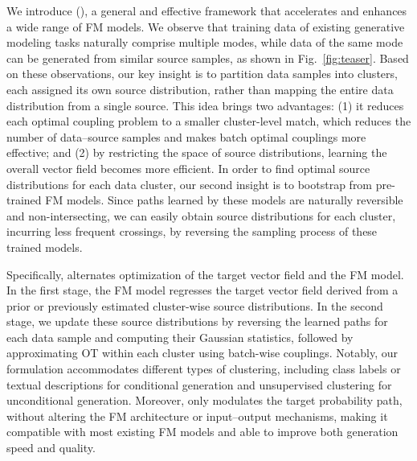 We introduce \methodfull{} (\method{}), a general and effective framework that accelerates and enhances a wide range of FM models. We observe that training data of existing generative modeling tasks naturally comprise multiple modes, while data of the same mode can be generated from similar source samples, as shown in Fig.~\ref{fig:teaser}. Based on these observations, our key insight is to partition data samples into clusters, each assigned its own source distribution, rather than mapping the entire data distribution from a single source. This idea brings two advantages: (1) it reduces each optimal coupling problem to a smaller cluster-level match, which reduces the number of data–source samples and makes batch optimal couplings more effective; and (2) by restricting the space of source distributions, learning the overall vector field becomes more efficient. In order to find optimal source distributions for each data cluster, our second insight is to bootstrap from pre-trained FM models. Since paths learned by these models are naturally reversible and non-intersecting, we can easily obtain source distributions for each cluster, incurring less frequent crossings, by reversing the sampling process of these trained models.

Specifically, \method{} alternates optimization of the target vector field and the FM model. In the first stage, the FM model regresses the target vector field derived from a prior or previously estimated cluster-wise source distributions. In the second stage, we update these source distributions by reversing the learned paths for each data sample and computing their Gaussian statistics, followed by approximating OT within each cluster using batch-wise couplings. Notably, our formulation accommodates different types of clustering, including class labels or textual descriptions for conditional generation and unsupervised clustering for unconditional generation. Moreover, \method{} only modulates the target probability path, without altering the FM architecture or input–output mechanisms, making it compatible with most existing FM models and able to improve both generation speed and quality.

